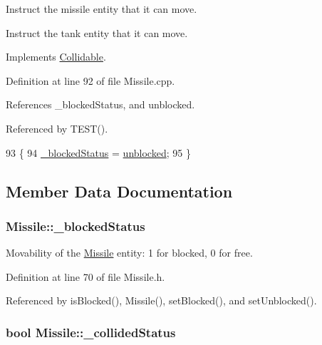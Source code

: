 Instruct the missile entity that it can move. 

Instruct the tank entity that it can move. 

Implements \hyperlink{classCollidable_a817d864d0640bc6bcb13bbecf14ddf31}{Collidable}.



Definition at line 92 of file Missile.\-cpp.



References \-\_\-blocked\-Status, and unblocked.



Referenced by T\-E\-S\-T().


\begin{DoxyCode}
93 \{
94     \hyperlink{classMissile_a34065d77889cdf8ac998d83dc0b3a242}{\_blockedStatus} = \hyperlink{Structures_8h_a6fef29d9424addfa69bdd2a379424896a1596fbf6035468467c790068b609ced3}{unblocked};
95 \}
\end{DoxyCode}


\subsection{Member Data Documentation}
\hypertarget{classMissile_a34065d77889cdf8ac998d83dc0b3a242}{
\subsubsection[{\-\_\-blocked\-Status}]{ Missile\-::\-\_\-blocked\-Status\hspace{0.3cm}{\ttfamily [private]}}}\label{classMissile_a34065d77889cdf8ac998d83dc0b3a242}


Movability of the \hyperlink{classMissile}{Missile} entity\-: 1 for blocked, 0 for free. 



Definition at line 70 of file Missile.\-h.



Referenced by is\-Blocked(), Missile(), set\-Blocked(), and set\-Unblocked().

\hypertarget{classMissile_a52e8aaac3c5db45c8d4c1ac74d001f57}{
\subsubsection[{\-\_\-collided\-Status}]{\setlength{\rightskip}{0pt plus 5cm}bool Missile\-::\-\_\-collided\-Status\hspace{0.3cm}{\ttfamily [private]}}}\label{classMissile_a52e8aaac3c5db45c8d4c1ac74d001f57}


